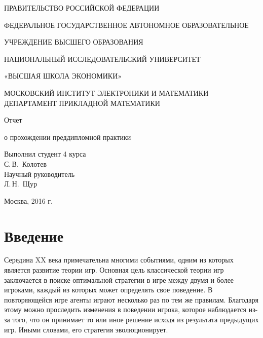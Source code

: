 \documentclass[12pt,a4paper]{article}
\begin{document}
	
	\begin{titlepage}
		\begin{center}
			\large
			ПРАВИТЕЛЬСТВО РОССИЙСКОЙ ФЕДЕРАЦИИ
			
			ФЕДЕРАЛЬНОЕ ГОСУДАРСТВЕННОЕ АВТОНОМНОЕ ОБРАЗОВАТЕЛЬНОЕ 
			
			УЧРЕЖДЕНИЕ ВЫСШЕГО ОБРАЗОВАНИЯ
			
			НАЦИОНАЛЬНЫЙ ИССЛЕДОВАТЕЛЬСКИЙ УНИВЕРСИТЕТ
			
			«ВЫСШАЯ ШКОЛА ЭКОНОМИКИ»\\[12pt]
			\vspace{0.25cm}
			
			МОСКОВСКИЙ ИНСТИТУТ ЭЛЕКТРОНИКИ И МАТЕМАТИКИ
			ДЕПАРТАМЕНТ ПРИКЛАДНОЙ МАТЕМАТИКИ
			
			\vspace{2cm}
			
			{\large Отчет 
				
				о прохождении преддипломной практики}
			\bigskip
		\end{center}
		\vfill
		
		\hfill\begin{minipage}{0.35\textwidth}
			Выполнил студент 4 курса\\
			С.\,В.~Колотев\\
			
			
			Научный руководитель\\
			Л.\,Н.~Щур\\
		\end{minipage}%
		\bigskip
		\vfill
		
		
		\begin{center}
			Москва, 2016 г.
		\end{center}
	\end{titlepage}
	
	\renewcommand\contentsname{Оглавление}
	\section{Введение}
	
	\par Середина XX века примечательна многими событиями, одним из которых является
	развитие теории игр. Основная цель классической теории игр заключается в поиске
	оптимальной стратегии в игре между двумя и более игроками, каждый из которых может
	определять свое поведение. В повторяющейся игре агенты играют несколько раз по 
	тем же правилам. Благодаря этому можно проследить изменения в поведении игрока,
	которое наблюдается из-за того, что он принимает то или иное решение исходя из
	результата предыдущих игр. Иными словами, его стратегия эволюционирует. 
	
\end{document}
